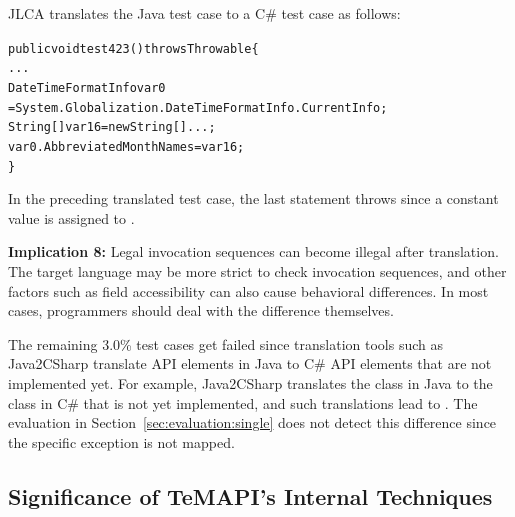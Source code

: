 JLCA translates the Java test case to a C\# test case as follows:

\begin{CodeOut}%
\begin{alltt}
public void test423() throws Throwable\{
  ...
  DateTimeFormatInfo var0
    = System.Globalization.DateTimeFormatInfo.CurrentInfo;
  String[] var16 = new String[]{...};
  var0.AbbreviatedMonthNames = var16;
\}
\end{alltt}
\end{CodeOut}%

In the preceding translated test case, the last statement throws  since a constant value is assigned to .

\textbf{Implication 8:} Legal invocation sequences can become illegal after translation. The target language may be more strict to check invocation sequences, and other factors such as field accessibility can also cause behavioral differences. In most cases, programmers should deal with the difference themselves.

The remaining 3.0\% test cases get failed since translation tools such as Java2CSharp translate API elements in Java to C\# API elements that are not implemented yet. For example, Java2CSharp translates the  class in Java to the  class in C\# that is not yet implemented, and such translations lead to . The evaluation in Section~\ref{sec:evaluation:single} does not detect this difference since the specific exception is not mapped.

\subsection{Significance of TeMAPI's Internal Techniques}
\label{sec:evaluation:techniques}


